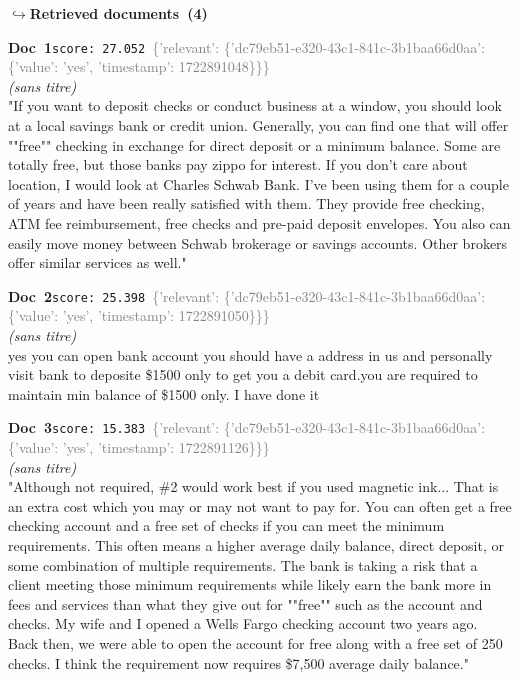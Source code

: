 \documentclass[a4paper,11pt]{article}
\begin{document}
\noindent\hfill{\footnotesize\textcolor{doccolor}{\textbf{$\hookrightarrow$\enspace Retrieved documents~(4)}}}
\begin{docenv}
{\footnotesize\textcolor{doccolor}{\textbf{Doc~1}}}\hfill{\tiny\texttt{score:~27.052}}\ {\tiny\textcolor{gray}{\{'relevant': \{'dc79eb51-e320-43c1-841c-3b1baa66d0aa': \{'value': 'yes', 'timestamp': 1722891048\}\}\}}}\\[3pt]
{\small\textit{(sans titre)}}\\[2pt]
\vspace{2pt}
{\footnotesize 
"If you want to deposit checks or conduct business at a window, you should look at a local savings bank or credit union. Generally, you can find one that will offer ""free"" checking in exchange for direct deposit or a minimum balance. Some are totally free, but those banks pay zippo for interest. If you don't care about location, I would look at Charles Schwab Bank. I've been using them for a couple of years and have been really satisfied with them. They provide free checking, ATM fee reimbursement, free checks and pre-paid deposit envelopes. You also can easily move money between Schwab brokerage or savings accounts. Other brokers offer similar services as well."}
\end{docenv}
\begin{docenv}
{\footnotesize\textcolor{doccolor}{\textbf{Doc~2}}}\hfill{\tiny\texttt{score:~25.398}}\ {\tiny\textcolor{gray}{\{'relevant': \{'dc79eb51-e320-43c1-841c-3b1baa66d0aa': \{'value': 'yes', 'timestamp': 1722891050\}\}\}}}\\[3pt]
{\small\textit{(sans titre)}}\\[2pt]
\vspace{2pt}
{\footnotesize 
yes you can open bank account you should have a address in us and personally visit bank to deposite \$1500 only to get you a debit card.you are required to maintain min balance of \$1500 only. I have done it}
\end{docenv}
\begin{docenv}
{\footnotesize\textcolor{doccolor}{\textbf{Doc~3}}}\hfill{\tiny\texttt{score:~15.383}}\ {\tiny\textcolor{gray}{\{'relevant': \{'dc79eb51-e320-43c1-841c-3b1baa66d0aa': \{'value': 'yes', 'timestamp': 1722891126\}\}\}}}\\[3pt]
{\small\textit{(sans titre)}}\\[2pt]
\vspace{2pt}
{\footnotesize 
"Although not required, \#2 would work best if you used magnetic ink... That is an extra cost which you may or may not want to pay for. You can often get a free checking account and a free set of checks if you can meet the minimum requirements. This often means a higher average daily balance, direct deposit, or some combination of multiple requirements. The bank is taking a risk that a client meeting those minimum requirements while likely earn the bank more in fees and services than what they give out for ""free"" such as the account and checks. My wife and I opened a Wells Fargo checking account two years ago. Back then, we were able to open the account for free along with a free set of 250 checks. I think the requirement now requires \$7,500 average daily balance."}
\end{docenv}
\end{document}

